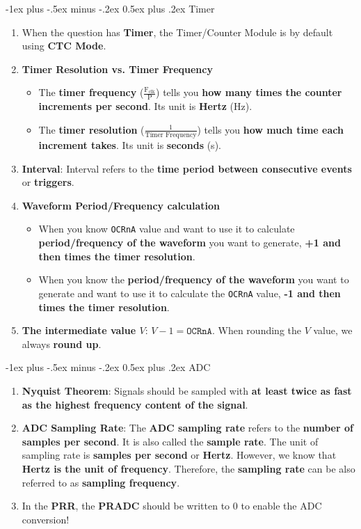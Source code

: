 \documentclass[10pt, landscape]{article}
\makeatletter
\renewcommand{\section}{\@startsection{section}{1}{0mm}%
                                {-1ex plus -.5ex minus -.2ex}%
                                {0.5ex plus .2ex}%
                                {\normalfont\large\bfseries}}
\makeatother
\begin{document}
\begin{multicols}{4}
\section{Timer}
\begin{enumerate}
    \item When the question has \textbf{Timer}, the Timer/Counter Module is by default using \textbf{CTC Mode}.
    \item \textbf{Timer Resolution vs. Timer Frequency}
    \begin{itemize}
        \item The \textbf{timer frequency} ($\frac{\text{F}_\text{clk}}{\text{P}}$) tells you \textbf{how many times the counter increments per second}. Its unit is \textbf{Hertz} (Hz).
        \item The \textbf{timer resolution} ($\frac{1}{\text{Timer Frequency}}$) tells you \textbf{how much time each increment takes}. Its unit is \textbf{seconds} (s).
    \end{itemize}
    \item \textbf{Interval}: Interval refers to the \textbf{time period between consecutive events} or \textbf{triggers}.
    \item \textbf{Waveform Period/Frequency calculation}
    \begin{itemize}
        \item When you know \texttt{OCRnA} value and want to use it to calculate \textbf{period/frequency of the waveform} you want to generate, \textbf{+1 and then times the timer resolution}.
        \item When you know the\textbf{ period/frequency of the waveform} you want to generate and want to use it to calculate the \texttt{OCRnA} value, \textbf{-1 and then times the timer resolution}.
    \end{itemize}
    \item \textbf{The intermediate value $V$}: $V-1=\texttt{OCRnA}$. When rounding the $V$ value, we always \textbf{round up}.
\end{enumerate}

\section{ADC}
\begin{enumerate}
    \item \textbf{Nyquist Theorem}: Signals should be sampled with \textbf{at least twice as fast as the highest frequency content of the signal}.
    \item \textbf{ADC Sampling Rate}: The \textbf{ADC sampling rate} refers to the \textbf{number of samples per second}. It is also called the \textbf{sample rate}. The unit of sampling rate is \textbf{samples per second} or \textbf{Hertz}. However, we know that \textbf{Hertz is the unit of frequency}. Therefore, the \textbf{sampling rate} can be also referred to as \textbf{sampling frequency}.
    \item In the \textbf{PRR}, the \textbf{PRADC} should be written to 0 to enable the ADC conversion!
\end{enumerate}


\end{multicols}
\end{document}
